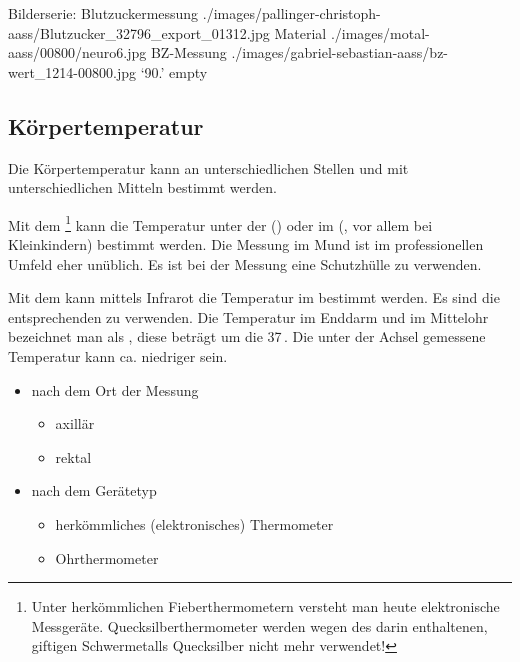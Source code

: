 \begin{PictureSeriesWide}{}{Bilderserie: Blutzuckermessung}
{./images/pallinger-christoph-aass/Blutzucker_32796_export_01312.jpg}
{Material }
{./images/motal-aass/00800/neuro6.jpg}
{BZ-Messung }
{./images/gabriel-sebastian-aass/bz-wert_1214-00800.jpg}
{\enquote*{90\MgDl*.} }
{empty}
{}
\end{PictureSeriesWide}






\subsection{Körpertemperatur}
\label{topic:koerpertemperatur-messung}

Die Körpertemperatur kann an unterschiedlichen Stellen und
mit unterschiedlichen Mitteln bestimmt werden. 

{%
Mit dem
\footnote{Unter
herkömmlichen Fieberthermometern versteht man heute
elektronische Messgeräte. Quecksilberthermometer werden
wegen des darin enthaltenen, giftigen Schwermetalls
Quecksilber nicht mehr verwendet!} kann die Temperatur unter
der  () oder im 
(, vor allem bei Kleinkindern) bestimmt werden.
Die Messung im Mund ist im professionellen Umfeld 
eher unüblich. Es ist
bei der Messung eine Schutzhülle zu verwenden.

Mit dem  kann mittels Infrarot die
Temperatur im  bestimmt werden. Es sind die
entsprechenden  zu verwenden.
Die Temperatur im Enddarm und im Mittelohr bezeichnet man
als , diese beträgt um die
37\,\DegC. Die unter der Achsel gemessene Temperatur kann
ca. \DegC* niedriger sein.
}{
\begin{itemize}
  \item nach dem Ort der Messung
  \begin{itemize}
    \item axillär
    \item rektal
  \end{itemize}
  \item nach dem Gerätetyp
  \begin{itemize}
    \item herkömmliches (elektronisches) Thermometer
    \item Ohrthermometer
  \end{itemize}
\end{itemize}
}{}{}{}





